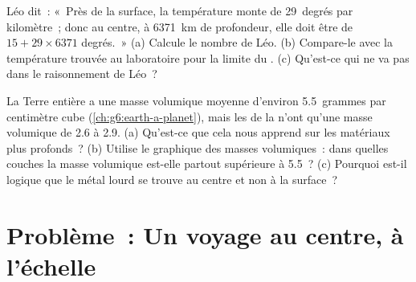 \begin{exercise}[$\star\star\star$]\label{exo:g6:inside-the-earth:11}
Léo dit~: «~Près de la surface, la température monte de 29~degrés par
kilomètre~; donc au centre, à 6371~km de profondeur, elle doit être de
$15 + 29 \times 6371$ degrés.~» (a) Calcule le nombre de Léo. (b) Compare-le
avec la température trouvée au laboratoire pour la limite du . (c) Qu'est-ce qui ne va pas dans le raisonnement de Léo~?
\end{exercise}

\begin{exercise}[$\star\star\star$]\label{exo:g6:inside-the-earth:12}
La Terre entière a une masse volumique moyenne d'environ 5.5~grammes par
centimètre cube (\cref{ch:g6:earth-a-planet}), mais les  de la
 n'ont qu'une masse volumique de 2.6 à 2.9. (a) Qu'est-ce que cela
nous apprend sur les matériaux plus profonds~? (b) Utilise le graphique des
masses volumiques~: dans quelles couches la masse volumique est-elle
partout supérieure à 5.5~? (c) Pourquoi est-il logique que le métal lourd
se trouve au centre et non à la surface~?
\end{exercise}

\section{Problème~: Un voyage au centre, à l'échelle}


